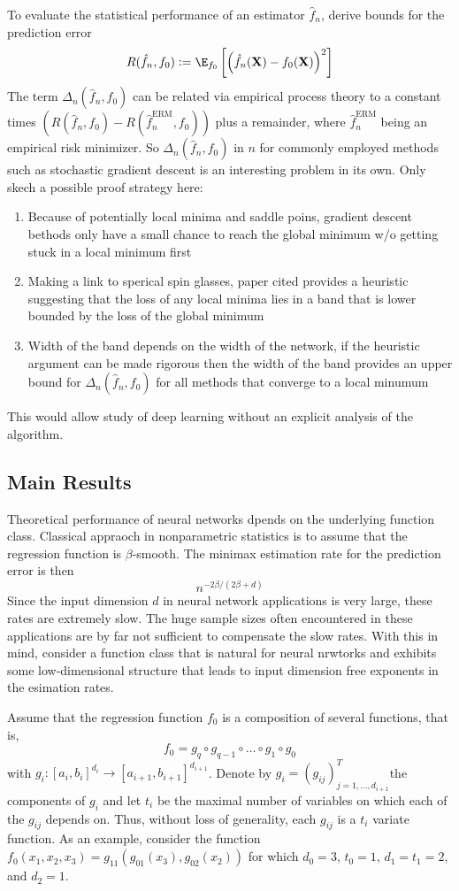 To evaluate the statistical performance of an estimator $\hat{f}_n$, derive bounds for the prediction error 
\[R(\hat{f}_n, f_0) := \E_{f_0}\left[\left(\hat{f}_n(\vX)-f_0(\vX)\right)^2\right]\]
The term $\Delta_n(\hat{f}_n, f_0)$ can be related via empirical process theory to a constant times $(R(\hat{f}_n, f_0)-R(\hat{f}_n^{\text{ERM}}, f_0))$ plus a remainder, where $\hat{f}_n^{\text{ERM}}$ being an empirical risk minimizer. So $\Delta_n(\hat{f}_n, f_0)$ in $n$ for commonly employed methods such as stochastic gradient descent is an interesting problem in its own. Only skech a possible proof strategy here: 
\begin{enumerate}
	\item Because of potentially local minima and saddle poins, gradient descent bethods only have a small chance to reach the global minimum w/o getting stuck in a local minimum first
	\item Making a link to sperical spin glasses, paper cited provides a heuristic suggesting that the loss of any local minima lies in a band that is lower bounded by the loss of the global minimum
	\item Width of the band depends on the width of the network, if the heuristic argument can be made rigorous then the width of the band provides an upper bound for $\Delta_n(\hat{f}_n, f_0)$ for all methods that converge to a local minumum 
\end{enumerate}
This would allow study of deep learning without an explicit analysis of the algorithm. 

\subsection{Main Results}

Theoretical performance of neural networks dpends on the underlying function class. Classical appraoch in nonparametric statistics is to assume that the regression function is $\beta$-smooth. The minimax estimation rate for the prediction error is then 
\[n^{-2\beta/(2\beta + d)}\]
Since the input dimension $d$ in neural network applications is very large, these rates are extremely slow. The huge sample sizes often encountered in these applications are by far not sufficient to compensate the slow rates.  With this in mind, consider a function class that is natural for neural nrwtorks and exhibits some low-dimensional structure that leads to input dimension free exponents in the esimation rates. 

Assume that the regression function $f_0$ is a composition of several functions, that is, 
\begin{equation}
	\label{eq:sh-6}
	f_0 = g_q\circ g_{q-1} \circ \dots \circ g_1 \circ g_0
\end{equation}
with $g_i:[a_i,b_i]^{d_i} \to [a_{i+1}, b_{i+1}]^{d_{i+1}}$. Denote by $g_i = (g_{ij})^T_{j=1,\dots,d_{i+1}}$the components of $g_i$ and let $t_i$ be the maximal number of variables on which each of the $g_{ij}$ depends on. Thus, without loss of generality, each $g_{ij}$ is a $t_i$ variate function. As an example, consider the function $f_0(x_1, x_2, x_3) = g_{11}(g_{01}(x_3), g_{02}(x_2))$ for which $d_0 = 3$, $t_0= 1$, $d_1 = t_1 = 2$, and $d_2=1$. 

